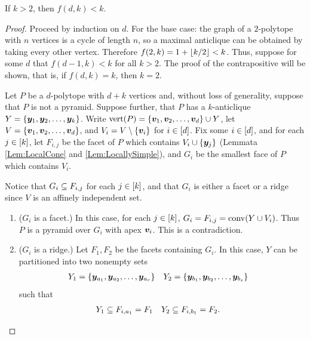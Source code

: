 \begin{Theorem}\label{Thm:Anticliques}
    If \(k>2\), then \(f(d,k)<k\).
\end{Theorem}
\begin{proof}
    Proceed by induction on \(d\).  For the base case: the graph of a \(2\)-polytope with \(n\) vertices is a cycle of length \(n\), so a maximal anticlique can be obtained by taking every other vertex. Therefore \(f(2,k)=1+\left\lfloor k/2\right\rfloor<k\).  Thus, suppose  for some \(d\) that \(f(d-1,k)<k\) for all \(k>2\).  The proof of the contrapositive will be shown, that is, if \(f(d,k)=k\), then \(k=2\).

    Let \(P\) be a \(d\)-polytope with \(d+k\) vertices and, without loss of generality, suppose that \(P\) is not a pyramid.  Suppose further, that \(P\) has a \(k\)-anticlique \(Y=\left\{\bm{y}_1,\bm{y}_2,\dotsc,\bm{y}_k\right\}\).  Write \(\operatorname{vert}(P)=\left\{\bm{v}_1,\bm{v}_2,\dotsc,\bm{v}_d\right\}\cup Y\), let \(V=\left\{\bm{v}_1,\bm{v}_2,\dotsc,\bm{v}_d\right\}\), and \(V_i=V\setminus\left\{\bm{v}_i\right\}\) for \(i\in\left[d\right]\).  Fix some \(i\in\left[d\right]\), and for each \(j\in\left[k\right]\), let \(F_{i,j}\) be the facet of \(P\) which contains \(V_i\cup\left\{\bm{y}_j\right\}\) (Lemmata \ref{Lem:LocalCone} and \ref{Lem:LocallySimple}), and \(G_i\) be the smallest face of \(P\) which contains \(V_i\).

    Notice that \(G_i\subseteq F_{i,j}\) for each \(j\in\left[k\right]\), and that \(G_i\) is either a facet or a ridge since \(V\) is an affinely independent set.

        \begin{enumerate}
            \item   (\(G_i\) is a facet.)  In this case, for each \(j\in\left[k\right]\), \(G_i=F_{i,j}=\operatorname{conv}(Y\cup V_i)\).  Thus \(P\) is a pyramid over \(G_i\) with apex \(\bm{v}_i\).  This is a contradiction.
            \item   (\(G_i\) is a ridge.)  Let \(F_1,F_2\) be the facets containing \(G_i\).  In this case, \(Y\) can be partitioned into two nonempty sets
                    \begin{align*}
                        Y_1 &=  \left\{\bm{y}_{a_1},\bm{y}_{a_2},\dotsc,\bm{y}_{a_r}\right\}&
                        Y_2 &=  \left\{\bm{y}_{b_1},\bm{y}_{b_2},\dotsc,\bm{y}_{b_s}\right\}&
                    \end{align*}
                such that
                    \begin{align*}
                        Y_1 &\subseteq F_{i,a_1}   =   F_1&
                        Y_2 &\subseteq F_{i,b_1}   =   F_2.&
                    \end{align*}


\end{enumerate}
\end{proof}

